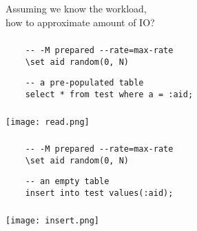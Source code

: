 \documentclass[usenames,dvipsnames, 18pt, compress, aspectratio=169]{beamer}
\begin{document}
\begin{frame}[fragile]{}
    \frametitle{}

    Assuming we know the workload,\\
    how to approximate amount of IO?
\end{frame}

\begin{frame}[fragile]{}
    \frametitle{}

    \begin{verbatim}
    -- -M prepared --rate=max-rate
    \set aid random(0, N)
    \end{verbatim}

    \begin{verbatim}
    -- a pre-populated table
    select * from test where a = :aid;
    \end{verbatim}

\end{frame}

\begin{frame}[fragile]{}
    \frametitle{}
    \begin{center}

        \texttt{[image: read.png]}

    \end{center}
\end{frame}

\begin{frame}[fragile]{}
    \frametitle{}

    \begin{verbatim}
    -- -M prepared --rate=max-rate
    \set aid random(0, N)
    \end{verbatim}

    \begin{verbatim}
    -- an empty table
    insert into test values(:aid);
    \end{verbatim}

\end{frame}

\begin{frame}[fragile]{}
    \frametitle{}
    \begin{center}

        \texttt{[image: insert.png]}

    \end{center}
\end{frame}
\end{document}
